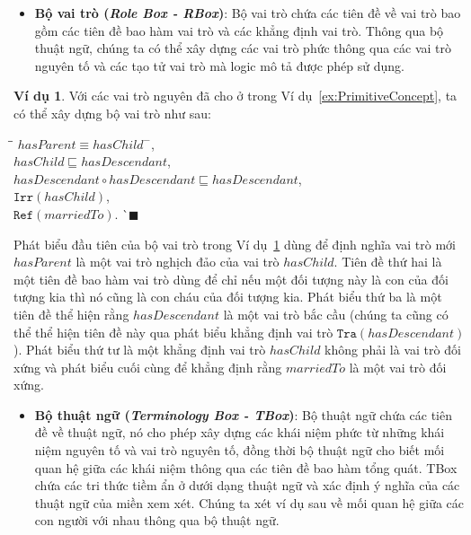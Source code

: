 \documentclass[12pt,a4paper,twoside]{report}
\newcommand{\Ref}			{\mathtt{Ref}}
\newcommand{\Irr}			{\mathtt{Irr}}
\newcommand{\Tra}			{\mathtt{Tra}}
\newcommand{\myend}		{\mbox{}\hfill\mbox{{\scriptsize$\!\blacksquare$}}}
\newcommand{\hasChild}		{hasChild}
\newcommand{\hasParent}		{hasParent}
\newcommand{\marriedTo}		{marriedTo}
\newcommand{\hasDescendant}	{hasDescendant}
\theoremstyle{definition}
\newtheorem{Example}{Ví dụ}[chapter]
\begin{document}
\begin{itemize}
  \item \textbf{Bộ vai trò ({\em Role Box - RBox})}: Bộ vai trò chứa các tiên đề về vai trò bao gồm các tiên đề bao hàm vai trò và các khẳng định vai trò. Thông qua bộ thuật ngữ, chúng ta có thể xây dựng các vai trò phức thông qua các vai trò nguyên tố và các tạo tử vai trò mà logic mô tả được phép sử dụng.
\end{itemize}

\begin{Example}
\label{ex:RBox}
Với các vai trò nguyên đã cho ở trong Ví dụ~\ref{ex:PrimitiveConcept}, ta có thể xây dựng bộ vai trò như sau:  
\begin{tabbing}
  \hspace*{.85cm}\=\hspace*{\textwidth}\=\kill
  \> $\hasParent \equiv \hasChild^-$,\\[0.5ex]
  \> $\hasChild \sqsubseteq \hasDescendant$,\\[0.5ex]
  \> $\hasDescendant \circ \hasDescendant \sqsubseteq \hasDescendant$,\\[0.5ex]
  \> $\Irr(\hasChild)$,\\[0.5ex]
  \> $\Ref(\marriedTo)$. \`\myend
  \end{tabbing}
\end{Example}

Phát biểu đầu tiên của bộ vai trò trong Ví dụ~\ref{ex:RBox} dùng để định nghĩa vai trò mới $\hasParent$ là một vai trò nghịch đảo của vai trò $\hasChild$. Tiên đề thứ hai là một tiên đề bao hàm vai trò dùng để chỉ nếu một đối tượng này là con của đối tượng kia thì nó cũng là con cháu của đối tượng kia. Phát biểu thứ ba là một tiên đề thể hiện rằng $\hasDescendant$ là một vai trò bắc cầu (chúng ta cũng có thể thể hiện tiên đề này qua phát biểu khẳng định vai trò $\Tra(\hasDescendant)$). Phát biểu thứ tư là một khẳng định vai trò $\hasChild$ không phải là vai trò đối xứng và phát biểu cuối cùng để khẳng định rằng $\marriedTo$ là một vai trò đối xứng.

\begin{itemize}
  \item \textbf{Bộ thuật ngữ ({\em Terminology Box - TBox})}: Bộ thuật ngữ chứa các tiên đề về thuật ngữ, nó cho phép xây dựng các khái niệm phức từ những khái niệm nguyên tố và vai trò nguyên tố, đồng thời bộ thuật ngữ cho biết mối quan hệ giữa các khái niệm thông qua các tiên đề bao hàm tổng quát. 
  TBox chứa các tri thức tiềm ẩn ở dưới dạng thuật ngữ và xác định ý nghĩa của các thuật ngữ của miền xem xét.
  Chúng ta xét ví dụ sau về mối quan hệ giữa các con người với nhau thông qua bộ thuật ngữ.
\end{itemize}
  
\end{document}
